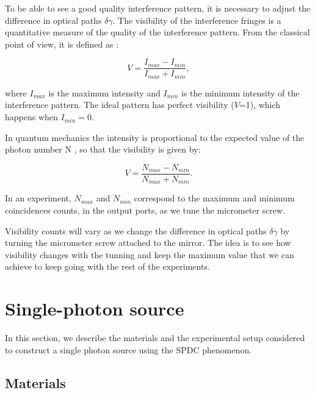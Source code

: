 \documentclass[12pt]{book}
\begin{document}
To be able to see a good quality interference pattern, it is necessary to adjust the difference in optical paths $\delta \gamma$. The visibility of the interference fringes is a quantitative measure of the quality of the interference pattern. From the classical point of view, it is defined as \cite{hecht}:

\begin{equation}
V=\frac{I_{max}-I_{min}}{I_{max}+I_{min}},
\end{equation}

where $I_{max}$ is the maximum intensity and $I_{min}$ is the minimum intensity of the interference pattern. The ideal pattern has perfect visibility ($V$=1), which happens when $I_{min}=0$.

In quantum mechanics the intensity is proportional to the expected value of the photon number N \cite {glauber}, so that the visibility is given by:

\begin{equation}
V=\frac{N_{max}-N_{min}}{N_{max}+N_{min}}.
\end{equation}

In an experiment, $N_{max}$ and $N_{min}$ correspond to the maximum and minimum coincidences counts, in the output ports, as we tune the micrometer screw.

Visibility counts will vary as we change the difference in optical paths $\delta\gamma$ by turning the micrometer screw attached to the mirror. The idea is to see how visibility changes with the tunning and keep the maximum value that we can achieve to keep going with the rest of the experiments.

\section{Single-photon source}



In this section, we describe the materials and the experimental setup considered to construct a single photon source using the SPDC phenomenon.


\subsection{Materials}
\end{document}
